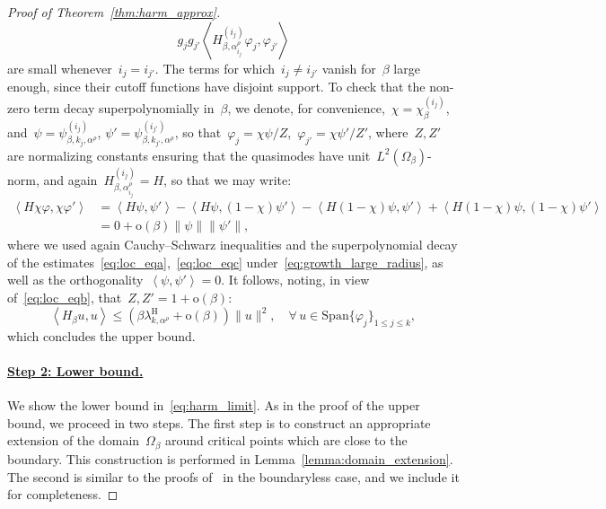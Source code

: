\documentclass[10pt]{article}
\newcommand{\1}{\mathbbm 1}
\newcommand{\shift}{\rho} %
\renewcommand{\o}{\mathrm{o}}
\begin{document}
\begin{proof}[Proof of Theorem~\ref{thm:harm_approx}]
        \[g_jg_{j'}\left\langle H_{\beta,\alpha_{i_j}^\shift}^{(i_j)}\varphi_j,\varphi_{j'}\right\rangle\]
        are small whenever~$i_j = i_{j'}$. The terms for which~$i_j \neq i_{j'}$ vanish for~$\beta$ large enough, since their cutoff functions have disjoint support.
        To check that the non-zero term decay superpolynomially in~$\beta$, we denote, for convenience,~$\chi = \chi_\beta^{(i_j)}$, and~$\psi = \psi^{(i_j)}_{\beta,k_j,\alpha^\shift}$, $\psi' = \psi^{(i_{j'})}_{\beta,k_{j'},\alpha^\shift}$, so that~$\varphi_j = \chi \psi/Z$,~$\varphi_{j'} = \chi\psi'/Z'$, where~$Z,Z'$ are normalizing constants ensuring that the quasimodes have unit~$L^2(\Omega_\beta)$-norm, and again~$H_{\beta,\alpha_{i_j}^\shift}^{(i_j)}=H$, so that we may write:
        \[\begin{aligned}
            \left\langle H\chi\varphi,\chi\varphi'\right\rangle &= \left\langle H\psi,\psi'\right\rangle - \left\langle H\psi,(1-\chi)\psi'\right\rangle - \left\langle H(1-\chi)\psi,\psi'\right\rangle + \left\langle H(1-\chi)\psi,(1-\chi)\psi'\right\rangle\\
            &= 0 + \o(\beta)\|\psi\|\|\psi'\|,
        \end{aligned}
        \]
        where we used again Cauchy--Schwarz inequalities and the superpolynomial decay of the estimates~\eqref{eq:loc_eqa},~\eqref{eq:loc_eqc} under~\eqref{eq:growth_large_radius}, as well as the orthogonality~$\left\langle \psi,\psi'\right\rangle = 0$.
        It follows, noting, in view of~\eqref{eq:loc_eqb}, that~$Z,Z' = 1 +\o(\beta)$:
        \[\left\langle H_\beta u,u\right\rangle \leq (\beta\lambda_{k,\alpha^\shift}^{\mathrm H}+\o(\beta))\|u\|^2,\quad \forall\,u\in\mathrm{Span}\{\varphi_j\}_{1\leq j\leq k},\]
        which concludes the upper bound.

        \paragraph{\underline{Step 2: Lower bound.}}
        We show the lower bound in~\eqref{eq:harm_limit}. As in the proof of the upper bound, we proceed in two steps.
        The first step is to construct an appropriate extension of the domain~$\Omega_\beta$ around critical points which are close to the boundary.
        This construction is performed in Lemma~\ref{lemma:domain_extension}.
        The second is similar to the proofs of~\cite{S83,CFKS87} in the boundaryless case, and we include it for completeness.


\end{proof}
\end{document}
